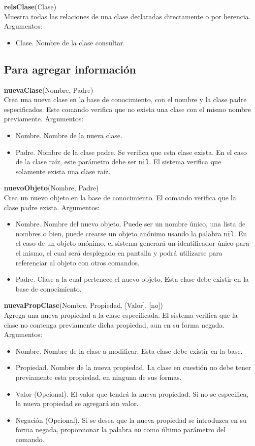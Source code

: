 \documentclass[11pt]{article}
\newcommand{\comando}[2]{
    \textbf{#1}(#2)\\
}
\newenvironment{args}{
    \newline
    Argumentos:
    \begin{itemize}
}{
    \end{itemize}
    \bigskip
}
\begin{document}
\comando{relsClase}{Clase}
Muestra todas las relaciones de una clase declaradas directamente o por herencia.
\begin{args}
    \item Clase. Nombre de la clase consultar.
\end{args}

\subsection{Para agregar información}

\comando{nuevaClase}{Nombre, Padre}
Crea una nueva clase en la base de conocimiento, con el nombre y la clase padre especificados. Este comando verifica que no exista una clase con el mismo nombre previamente.
\begin{args}
    \item Nombre. Nombre de la nueva clase.
    \item Padre. Nombre de la clase padre. Se verifica que esta clase exista. En el caso de la clase raíz, este parámetro debe ser \texttt{nil}. El sistema verifica que solamente exista una clase raíz.
\end{args}

\comando{nuevoObjeto}{Nombre, Padre}
Crea un nuevo objeto en la base de conocimiento. El comando verifica que la clase padre exista.
\begin{args}
    \item Nombre. Nombre del nuevo objeto. Puede ser un nombre único, una lista de nombres o bien, puede crearse un objeto anónimo usando la palabra \texttt{nil}. En el caso de un objeto anónimo, el sistema generará un identificador único para el mismo, el cual será desplegado en pantalla y podrá utilizarse para referenciar al objeto con otros comandos.
    \item Padre. Clase a la cual pertenece el nuevo objeto. Esta clase debe existir en la base de conocimiento.
\end{args}

\comando{nuevaPropClase}{Nombre, Propiedad, [Valor], [no]}
Agrega una nueva propiedad a la clase especificada. El sistema verifica que la clase no contenga previamente dicha propiedad, aun en su forma negada.
\begin{args}
    \item Nombre. Nombre de la clase a modificar. Esta clase debe existir en la base.
    \item Propiedad. Nombre de la nueva propiedad. La clase en cuestión no debe tener previamente esta propiedad, en ninguna de sus formas.
    \item Valor (Opcional). El valor que tendrá la nueva propiedad. Si no se especifica, la nueva propiedad se agregará sin valor.
    \item Negación (Opcional). Si se desea que la nueva propiedad se introduzca en su forma negada, proporcionar la palabra \texttt{no} como último parámetro del comando.
\end{args}
\end{document}
